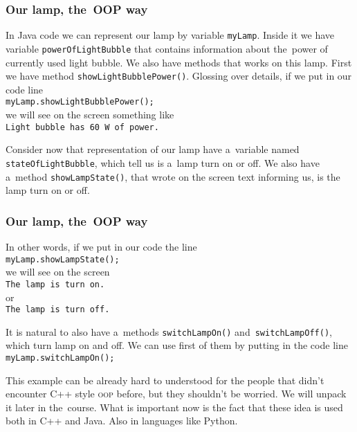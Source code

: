 \documentclass[10pt,t]{beamer}
\begin{document}
\begin{frame}
  \frametitle{Our lamp, the~OOP way}


  In Java code we can represent our lamp by variable \texttt{myLamp}. Inside
  it we have variable \texttt{powerOfLightBubble} that contains information
  about the~power of currently used light bubble. We also have methods
  that works on this lamp. First we have method
  \texttt{showLightBubblePower()}. Glossing over details, if we put in our
  code line \\
  \texttt{myLamp.showLightBubblePower();} \\
  we will see on the screen something like \\
  \texttt{Light bubble has 60 W of power.}

  Consider now that representation of our lamp have a~variable named
  \texttt{stateOfLightBubble}, which tell us is a~lamp turn on or off.
  We also have a~method \texttt{showLampState()}, that wrote on the screen
  text informing us, is the lamp turn on or off.

\end{frame}





\begin{frame}
  \frametitle{Our lamp, the~OOP way}


  In other words, if we put in our code the line \\
  \texttt{myLamp.showLampState();} \\
  we will see on the screen \\
  \texttt{The lamp is turn on.} \\
  or \\
  \texttt{The lamp is turn off.}

  It is natural to also have a~methods \texttt{switchLampOn()}
  and~\texttt{switchLampOff()}, which turn lamp on and off. We can use
  first of them by putting in the code line \\
  \texttt{myLamp.switchLampOn();}

  This example can be already hard to understood for the people that didn't
  encounter C++ style \textsc{oop} before, but they shouldn't be worried.
  We will unpack it later in the~course. What is important now is the fact
  that these idea is used both in C++ and Java. Also in languages like
  Python.

\end{frame}
\end{document}
